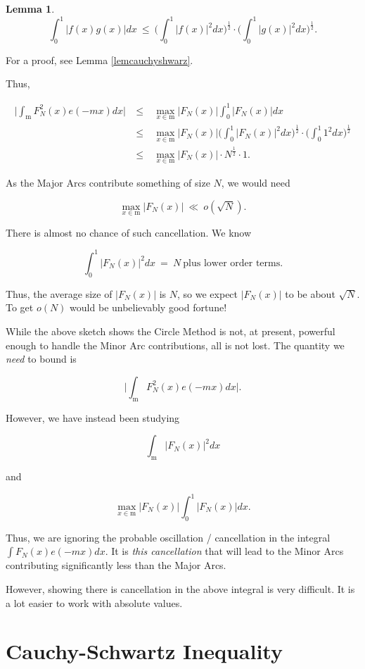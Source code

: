 \documentclass[12pt,letterpaper]{report}
\newcommand\be{\begin{equation}}
\newcommand\ee{\end{equation}}
\newcommand\bea{\begin{eqnarray}}
\newcommand\eea{\end{eqnarray}}
\newcommand{\foh}{\frac{1}{2}}  %
\newtheorem{lem}[thm]{Lemma}
\begin{document}
\begin{lem}

\be \int_0^1 |f(x)g(x)|dx \ \le \ \Big( \int_0^1 |f(x)|^2dx
\Big)^\foh \cdot \Big( \int_0^1 |g(x)|^2 dx\Big)^\foh. \ee
\end{lem}

For a proof, see Lemma \ref{lemcauchyshwarz}.

Thus,

\bea \Big|\int_{\mathrm{m}} F_N^2(x)e(-mx)dx \Big| &\ \le \ &
\max_{x \in \mathrm{m}} |F_N(x)| \int_0^1 |F_N(x)|dx \nonumber\\
&\ \le \ & \max_{x \in \mathrm{m}} |F_N(x)| \Big( \int_0^1
|F_N(x)|^2 dx \Big)^\foh \cdot \Big( \int_0^1 1^2 dx\Big)^\foh
\nonumber\\ &\ \le \ & \max_{x \in \mathrm{m}} |F_N(x)| \cdot
N^\foh \cdot 1. \eea

As the Major Arcs contribute something of size $N$, we would need

\be \max_{x \in \mathrm{m}} |F_N(x)| \ \ll \ o(\sqrt{N}). \ee

There is almost no chance of such cancellation. We know

\be \int_0^1 |F_N(x)|^2dx \ = \ N \ \text{plus lower order terms}.
\ee

Thus, the average size of $|F_N(x)|$ is $N$, so we expect
$|F_N(x)|$ to be about $\sqrt{N}$. To get $o(N)$ would be
unbelievably good fortune!

While the above sketch shows the Circle Method is not, at present,
powerful enough to handle the Minor Arc contributions, all is not
lost. The quantity we \emph{need} to bound is

\be \Big|\int_{\mathrm{m}} F_N^2(x)e(-mx)dx \Big|. \ee

However, we have instead been studying

\be \int_{\mathrm{m}} |F_N(x)|^2 dx \ee

and

\be  \max_{x \in \mathrm{m}} |F_N(x)| \int_0^1 |F_N(x)| dx. \ee

Thus, we are ignoring the probable oscillation / cancellation in
the integral $\int F_N(x) e(-mx)dx$. It is \emph{this
cancellation} that will lead to the Minor Arcs contributing
significantly less than the Major Arcs.

However, showing there is cancellation in the above integral is
very difficult. It is a lot easier to work with absolute values.


\section{Cauchy-Schwartz Inequality}
\end{document}
